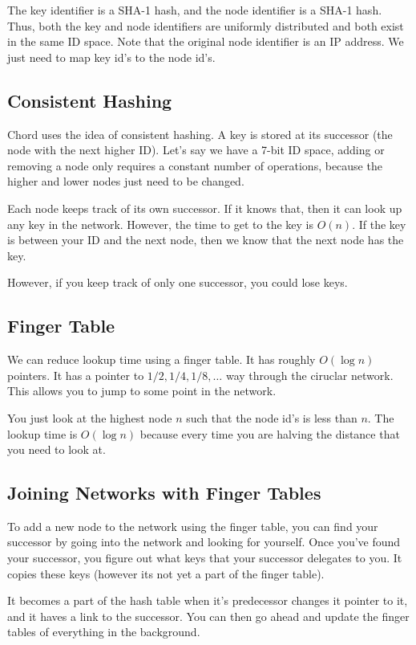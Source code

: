 \documentclass[psamsfonts]{amsart}
\begin{document}
The key identifier is a SHA-1 hash, and the node identifier is a SHA-1 hash. Thus, both the key and node identifiers are uniformly distributed and both exist in the same ID space. Note that the original node identifier is an IP address. We just need to map key id's to the node id's.

\subsection{Consistent Hashing}

Chord uses the idea of consistent hashing. A key is stored at its successor (the node with the next higher ID). Let's say we have a 7-bit ID space, adding or removing a node only requires a constant number of operations, because the higher and lower nodes just need to be changed.

Each node keeps track of its own successor. If it knows that, then it can look up any key in the network. However, the time to get to the key is $O(n)$. If the key is between your ID and the next node, then we know that the next node has the key.

However, if you keep track of only one successor, you could lose keys.

\subsection{Finger Table}

We can reduce lookup time using a finger table. It has roughly $O(\log n)$ pointers. It has a pointer to $1/2, 1/4, 1/8, \ldots$ way through the ciruclar network. This allows you to jump to some point in the network.

You just look at the highest node $n$ such that the node id's is less than $n$. The lookup time is $O(\log n)$ because every time you are halving the distance that you need to look at.

\subsection{Joining Networks with Finger Tables}

To add a new node to the network using the finger table, you can find your successor by going into the network and looking for yourself. Once you've found your successor, you figure out what keys that your successor delegates to you. It copies these keys (however its not yet a part of the finger table).

It becomes a part of the hash table when it's predecessor changes it pointer to it, and it haves a link to the successor. You can then go ahead and update the finger tables of everything in the background.
\end{document}
